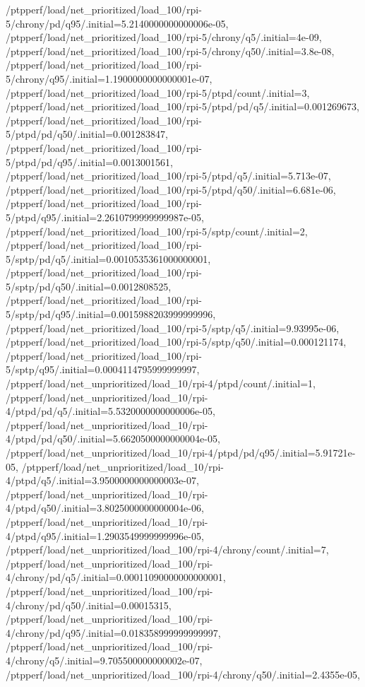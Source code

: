 {    /ptpperf/load/net_prioritized/load_100/rpi-5/chrony/pd/q95/.initial=5.2140000000000006e-05,
    /ptpperf/load/net_prioritized/load_100/rpi-5/chrony/q5/.initial=4e-09,
    /ptpperf/load/net_prioritized/load_100/rpi-5/chrony/q50/.initial=3.8e-08,
    /ptpperf/load/net_prioritized/load_100/rpi-5/chrony/q95/.initial=1.1900000000000001e-07,
    /ptpperf/load/net_prioritized/load_100/rpi-5/ptpd/count/.initial=3,
    /ptpperf/load/net_prioritized/load_100/rpi-5/ptpd/pd/q5/.initial=0.001269673,
    /ptpperf/load/net_prioritized/load_100/rpi-5/ptpd/pd/q50/.initial=0.001283847,
    /ptpperf/load/net_prioritized/load_100/rpi-5/ptpd/pd/q95/.initial=0.0013001561,
    /ptpperf/load/net_prioritized/load_100/rpi-5/ptpd/q5/.initial=5.713e-07,
    /ptpperf/load/net_prioritized/load_100/rpi-5/ptpd/q50/.initial=6.681e-06,
    /ptpperf/load/net_prioritized/load_100/rpi-5/ptpd/q95/.initial=2.2610799999999987e-05,
    /ptpperf/load/net_prioritized/load_100/rpi-5/sptp/count/.initial=2,
    /ptpperf/load/net_prioritized/load_100/rpi-5/sptp/pd/q5/.initial=0.0010535361000000001,
    /ptpperf/load/net_prioritized/load_100/rpi-5/sptp/pd/q50/.initial=0.0012808525,
    /ptpperf/load/net_prioritized/load_100/rpi-5/sptp/pd/q95/.initial=0.0015988203999999996,
    /ptpperf/load/net_prioritized/load_100/rpi-5/sptp/q5/.initial=9.93995e-06,
    /ptpperf/load/net_prioritized/load_100/rpi-5/sptp/q50/.initial=0.000121174,
    /ptpperf/load/net_prioritized/load_100/rpi-5/sptp/q95/.initial=0.0004114795999999997,
    /ptpperf/load/net_unprioritized/load_10/rpi-4/ptpd/count/.initial=1,
    /ptpperf/load/net_unprioritized/load_10/rpi-4/ptpd/pd/q5/.initial=5.5320000000000006e-05,
    /ptpperf/load/net_unprioritized/load_10/rpi-4/ptpd/pd/q50/.initial=5.6620500000000004e-05,
    /ptpperf/load/net_unprioritized/load_10/rpi-4/ptpd/pd/q95/.initial=5.91721e-05,
    /ptpperf/load/net_unprioritized/load_10/rpi-4/ptpd/q5/.initial=3.9500000000000003e-07,
    /ptpperf/load/net_unprioritized/load_10/rpi-4/ptpd/q50/.initial=3.8025000000000004e-06,
    /ptpperf/load/net_unprioritized/load_10/rpi-4/ptpd/q95/.initial=1.2903549999999996e-05,
    /ptpperf/load/net_unprioritized/load_100/rpi-4/chrony/count/.initial=7,
    /ptpperf/load/net_unprioritized/load_100/rpi-4/chrony/pd/q5/.initial=0.00011090000000000001,
    /ptpperf/load/net_unprioritized/load_100/rpi-4/chrony/pd/q50/.initial=0.00015315,
    /ptpperf/load/net_unprioritized/load_100/rpi-4/chrony/pd/q95/.initial=0.018358999999999997,
    /ptpperf/load/net_unprioritized/load_100/rpi-4/chrony/q5/.initial=9.705500000000002e-07,
    /ptpperf/load/net_unprioritized/load_100/rpi-4/chrony/q50/.initial=2.4355e-05,
}
